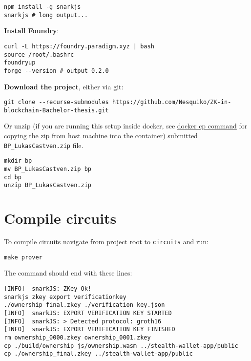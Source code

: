 \begin{verbatim}
npm install -g snarkjs
snarkjs # long output...
\end{verbatim}

\textbf{Install Foundry}:
\begin{verbatim}
curl -L https://foundry.paradigm.xyz | bash
source /root/.bashrc
foundryup
forge --version # output 0.2.0
\end{verbatim}

\textbf{Download the project}, either via git:

\begin{verbatim}
git clone --recurse-submodules https://github.com/Nesquiko/ZK-in-blockchain-Bachelor-thesis.git
\end{verbatim}

Or unzip (if you are running this setup inside docker, see \href{https://docs.docker.com/reference/cli/docker/container/cp/}
{docker cp command} for copying the zip from host machine into the container)
submitted \texttt{BP\_LukasCastven.zip} file.

\begin{verbatim}
mkdir bp
mv BP_LukasCastven.zip bp
cd bp
unzip BP_LukasCastven.zip
\end{verbatim}

\section{Compile circuits}

To compile circuits navigate from project root to \texttt{circuits} and run:
\begin{verbatim}
make prover
\end{verbatim}

The command should end with these lines:

\begin{verbatim}
[INFO]  snarkJS: ZKey Ok!
snarkjs zkey export verificationkey
./ownership_final.zkey ./verification_key.json
[INFO]  snarkJS: EXPORT VERIFICATION KEY STARTED
[INFO]  snarkJS: > Detected protocol: groth16
[INFO]  snarkJS: EXPORT VERIFICATION KEY FINISHED
rm ownership_0000.zkey ownership_0001.zkey
cp ./build/ownership_js/ownership.wasm ../stealth-wallet-app/public
cp ./ownership_final.zkey ../stealth-wallet-app/public
\end{verbatim}


